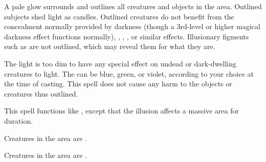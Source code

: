 \begin{comment}
\subsubsection{F}
\end{comment}

\spellrng{\rngmed}
\begin{spelleffect}
  A pale glow surrounds and outlines all creatures and objects in the area. Outlined subjects shed light as candles. Outlined creatures do not benefit from the concealment normally provided by darkness (though a 3rd-level or higher magical darkness effect functions normally), , , , or similar effects. Illusionary figments such as  are not outlined, which may reveal them for what they are.

  The light is too dim to have any special effect on undead or dark-dwelling creatures \vulnerable to light. The  can be blue, green, or violet, according to your choice at the time of casting. This spell does not cause any harm to the objects or creatures thus outlined.
\end{spelleffect}

\begin{spelleffect}
    This spell functions like , except that the illusion affects a massive area for \durlong duration.
\end{spelleffect}

\begin{spellhealthy}
    Creatures in the area are \shaken.
\end{spellhealthy}
\begin{spellblood}
    Creatures in the area are \frightened.
\end{spellblood}

